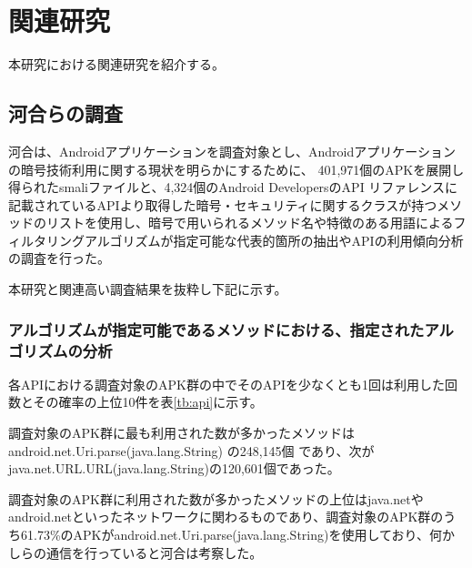 \newpage
\section{関連研究} %
本研究における関連研究を紹介する。

\subsection{河合らの調査}
河合は、Androidアプリケーションを調査対象とし、Androidアプリケーションの暗号技術利用に関する現状を明らかにするために、
401,971個のAPKを展開し得られたsmaliファイルと、4,324個のAndroid DevelopersのAPI リファレンスに記載されているAPIより取得した暗号・セキュリティに関するクラスが持つメソッドのリストを使用し、暗号で用いられるメソッド名や特徴のある用語によるフィルタリングアルゴリズムが指定可能な代表的箇所の抽出やAPIの利用傾向分析の調査を行った。

本研究と関連高い調査結果を抜粋し下記に示す。

\subsubsection{アルゴリズムが指定可能であるメソッドにおける、指定されたアルゴリズムの分析}
各APIにおける調査対象のAPK群の中でそのAPIを少なくとも1回は利用した回数とその確率の上位10件を表\ref{tb:api}に示す。

調査対象のAPK群に最も利用された数が多かったメソッドは
android.net.Uri.parse(java.lang.String) の248,145個
であり、次がjava.net.URL.URL(java.lang.String)の120,601個であった。

調査対象のAPK群に利用された数が多かったメソッドの上位はjava.netやandroid.netといったネットワークに関わるものであり、調査対象のAPK群のうち61.73\%のAPKがandroid.net.Uri.parse(java.lang.String)を使用しており、何かしらの通信を行っていると河合は考察した。

